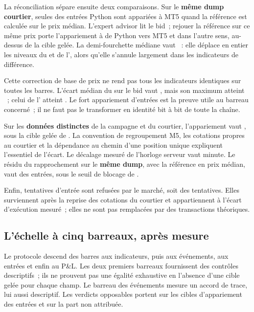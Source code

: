 


La réconciliation sépare ensuite deux comparaisons. Sur le \textbf{même dump
courtier}, seules \XTenMTFiveMatchRate{} des entrées Python sont appariées à
MT5 quand la référence est calculée sur le prix médian. L'expert advisor lit le bid~; rejouer la
référence sur ce même prix porte l'appariement à
\XTenMTFiveMatchRateBid{} de Python vers MT5 et
\XTenMTFiveMatchRateBidReverse{} dans l'autre sens, au-dessus de la cible
gelée. La demi-fourchette médiane vaut \XTenBidHalfSpread~: elle déplace en
entier les niveaux du  et de l', alors qu'elle s'annule
largement dans les indicateurs de différence.

Cette correction de base de prix ne rend pas tous les indicateurs identiques
sur toutes les barres. L'écart médian du  sur le bid vaut
\XTenVwapDiffBid, mais son maximum atteint \XTenVwapBidMax~; celui de
l' atteint \XTenEmaBidMax. Le fort appariement d'entrées est la
preuve utile au barreau concerné~; il ne faut pas le transformer en identité
bit à bit de toute la chaîne.

Sur les \textbf{données distinctes} de la campagne et du courtier,
l'appariement vaut \XTenMTFiveMatchRateDiffData, sous la cible gelée de
\XTenTargetDiffData. La convention de regroupement M5, les cotations propres
au courtier et la dépendance au chemin d'une position unique expliquent
l'essentiel de l'écart. Le décalage mesuré de l'horloge serveur vaut
\XTenServerClockOffset{} minute. Le résidu du rapprochement sur le
\textbf{même dump}, avec la référence en prix médian, vaut
\XTenMTFiveUnattributed{} des entrées, sous le seuil de blocage de
\XTenUnattributedBlocker.



Enfin, \XTenMTFiveOrderFailures{} tentatives d'entrée sont refusées par le
marché, soit \XTenMTFiveRejectedShare{} des tentatives. Elles surviennent
après la reprise des cotations du courtier et appartiennent à l'écart
d'exécution mesuré~; elles ne sont pas remplacées par des transactions
théoriques.

\subsection{L'échelle à cinq barreaux, après mesure}

Le protocole descend des barres aux indicateurs, puis aux événements, aux
entrées et enfin au P\&L. Les deux premiers barreaux fournissent des contrôles
descriptifs~; ils ne prouvent pas une égalité exhaustive en l'absence d'une
cible gelée pour chaque champ. Le barreau des événements mesure un accord de
trace, lui aussi descriptif. Les verdicts opposables portent sur les cibles
d'appariement des entrées et sur la part non attribuée.

